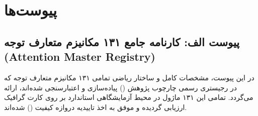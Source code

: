 \chapter*{پیوست‌ها}

\section*{پیوست الف: کارنامه جامع ۱۳۱ مکانیزم متعارف توجه (Attention Master Registry)}

در این پیوست، مشخصات کامل و ساختار ریاضی تمامی ۱۳۱ مکانیزم متعارف توجه که در رجیستری رسمی چارچوب پژوهش () پیاده‌سازی و اعتبارسنجی شده‌اند، ارائه می‌گردد. تمامی این ۱۳۱ ماژول در محیط آزمایشگاهی استاندارد بر روی کارت گرافیک  ارزیابی گردیده و موفق به اخذ تاییدیه دروازه کیفیت () شده‌اند.


